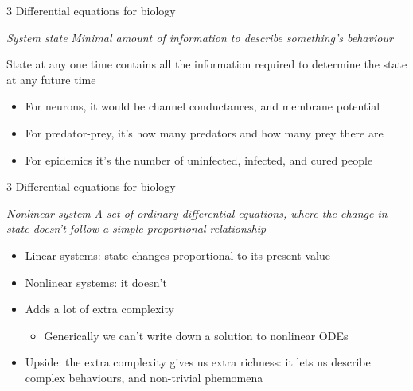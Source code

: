 \documentclass[presentation]{beamer}
\begin{document}
\begin{frame}[label={sec:org456e10b}]{3 Differential equations for biology}
\begin{block}{\emph{System state}}
\emph{Minimal amount of information to describe something's behaviour}
\end{block}

\begin{block}{}
State at any one time contains all the information required to determine the state at any future time

\begin{itemize}
\item For neurons, it would be channel conductances, and membrane potential
\item For predator-prey, it's how many predators and how many prey there are
\item For epidemics it's the number of uninfected, infected, and cured people
\end{itemize}
\end{block}
\end{frame}

\begin{frame}[label={sec:org52ec30a}]{3 Differential equations for biology}
\begin{block}{\emph{Nonlinear system}}
\emph{A set of ordinary differential equations, where the change in state doesn't follow a simple proportional relationship}
\end{block}

\begin{block}{}
\begin{itemize}
\item Linear systems: state changes proportional to its present value
\item Nonlinear systems: it doesn't
\item Adds a lot of extra complexity
\begin{itemize}
\item Generically we can't write down a solution to nonlinear ODEs
\end{itemize}
\item Upside: the extra complexity gives us extra richness: it lets us describe complex behaviours, and non-trivial phemomena
\end{itemize}
\end{block}
\end{frame}
\end{document}
